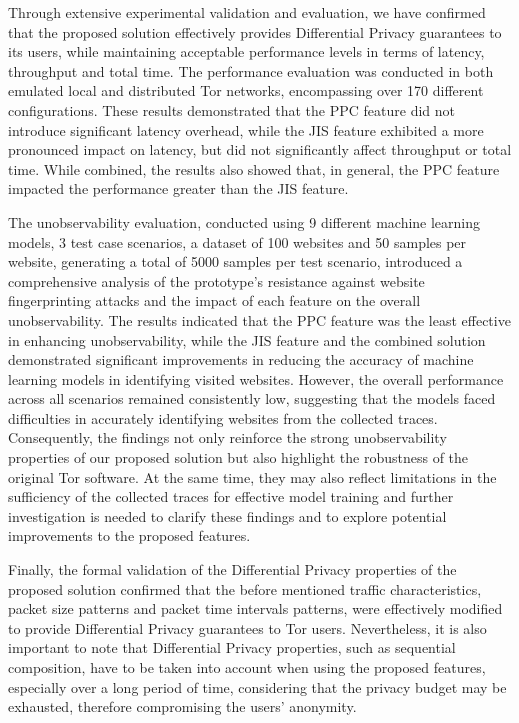 Through extensive experimental validation and evaluation, we have confirmed that the proposed solution effectively provides Differential Privacy guarantees to its users, while maintaining acceptable performance levels in terms of latency, throughput and total time. The performance evaluation was conducted in both emulated local and distributed Tor networks, encompassing over 170 different configurations. These results demonstrated that the PPC feature did not introduce significant latency overhead, while the JIS feature exhibited a more pronounced impact on latency, but did not significantly affect throughput or total time. While combined, the results also showed that, in general, the PPC feature impacted the performance greater than the JIS feature. 

The unobservability evaluation, conducted using 9 different machine learning models, 3 test case scenarios, a dataset of 100 websites and 50 samples per website, generating a total of 5000 samples per test scenario, introduced a comprehensive analysis of the prototype's resistance against website fingerprinting attacks and the impact of each feature on the overall unobservability. The results indicated that the PPC feature was the least effective in enhancing unobservability, while the JIS feature and the combined solution demonstrated significant improvements in reducing the accuracy of machine learning models in identifying visited websites. However, the overall performance across all scenarios remained consistently low, suggesting that the models faced difficulties in accurately identifying websites from the collected traces. Consequently, the findings not only reinforce the strong unobservability properties of our proposed solution but also highlight the robustness of the original Tor software. At the same time, they may also reflect limitations in the sufficiency of the collected traces for effective model training and further investigation is needed to clarify these findings and to explore potential improvements to the proposed features. 

Finally, the formal validation of the Differential Privacy properties of the proposed solution confirmed that the before mentioned traffic characteristics, packet size patterns and packet time intervals patterns, were effectively modified to provide Differential Privacy guarantees to Tor users. Nevertheless, it is also important to note that Differential Privacy properties, such as sequential composition, have to be taken into account when using the proposed features, especially over a long period of time, considering that the privacy budget may be exhausted, therefore compromising the users' anonymity.


